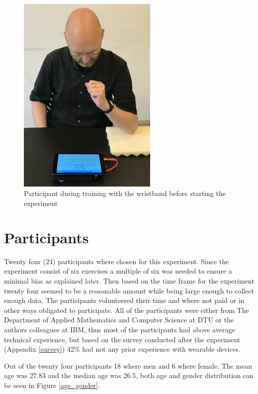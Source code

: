 \begin{figure}[h!]
    \centering
    \includegraphics[width=0.6\textwidth]{figures/ex1.jpg}
    \caption{Participant during training with the wristband before starting the experiment}
    \label{ex_jakob}
\end{figure}

\section{Participants}
Twenty four (24) participants where chosen for this experiment. Since the experiment consist of six exercises a multiple of six was needed to ensure a minimal bias as explained later. Then based on the time frame for the experiment twenty four seemed to be a reasonable amount while being large enough to collect enough data. The participants volunteered their time and where not paid or in other ways obligated to participate. All of the participants were either from The Department of Applied Mathematics and Computer Science at DTU or the authors colleagues at IBM, thus most of the participants had above average technical experience, but based on the survey conducted after the experiment (Appendix \ref{survey}) 42\% had not any prior experience with wearable devices.

Out of the twenty four participants 18 where men and 6 where female. The mean age was 27.83 and the median age was 26.5, both age and gender distribution can be seen in Figure \ref{age_gender}.

